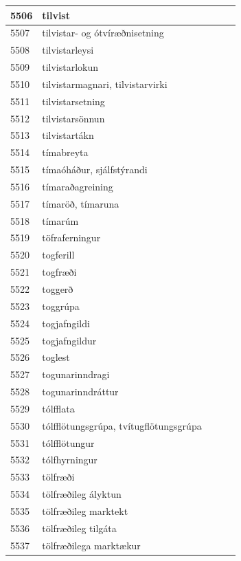 \begin{longtable}{p{}|p{}|p{}|p{}|p{}}
\hline
5506 & tilvist &  &  &  \\
\hline
5507 & tilvistar- og ótvíræðnisetning &  &  &  \\
\hline
5508 & tilvistarleysi &  &  &  \\
\hline
5509 & tilvistarlokun &  &  &  \\
\hline
5510 & tilvistarmagnari, tilvistarvirki &  &  &  \\
\hline
5511 & tilvistarsetning &  &  &  \\
\hline
5512 & tilvistarsönnun &  &  &  \\
\hline
5513 & tilvistartákn &  &  &  \\
\hline
5514 & tímabreyta &  &  &  \\
\hline
5515 & tímaóháður, sjálfstýrandi &  &  &  \\
\hline
5516 & tímaraðagreining &  &  &  \\
\hline
5517 & tímaröð, tímaruna &  &  &  \\
\hline
5518 & tímarúm &  &  &  \\
\hline
5519 & töfraferningur &  &  &  \\
\hline
5520 & togferill &  &  &  \\
\hline
5521 & togfræði &  &  &  \\
\hline
5522 & toggerð &  &  &  \\
\hline
5523 & toggrúpa &  &  &  \\
\hline
5524 & togjafngildi &  &  &  \\
\hline
5525 & togjafngildur &  &  &  \\
\hline
5526 & toglest &  &  &  \\
\hline
5527 & togunarinndragi &  &  &  \\
\hline
5528 & togunarinndráttur &  &  &  \\
\hline
5529 & tólfflata &  &  &  \\
\hline
5530 & tólfflötungsgrúpa, tvítugflötungsgrúpa &  &  &  \\
\hline
5531 & tólfflötungur &  &  &  \\
\hline
5532 & tólfhyrningur &  &  &  \\
\hline
5533 & tölfræði &  &  &  \\
\hline
5534 & tölfræðileg ályktun &  &  &  \\
\hline
5535 & tölfræðileg marktekt &  &  &  \\
\hline
5536 & tölfræðileg tilgáta &  &  &  \\
\hline
5537 & tölfræðilega marktækur &  &  &  \\

\end{longtable}
